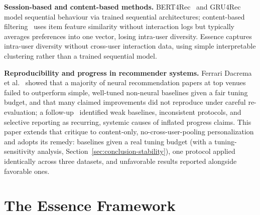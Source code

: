 \documentclass{article}
\begin{document}
\textbf{Session-based and content-based methods.} BERT4Rec~\cite{sun2019} and GRU4Rec~\cite{hidasi2016} model sequential behaviour via trained sequential architectures; content-based filtering~\cite{pazzani2007} uses item feature similarity without interaction logs but typically averages preferences into one vector, losing intra-user diversity. Essence captures intra-user diversity without cross-user interaction data, using simple interpretable clustering rather than a trained sequential model.

\textbf{Reproducibility and progress in recommender systems.} Ferrari Dacrema et al.~\cite{dacrema2019} showed that a majority of neural recommendation papers at top venues failed to outperform simple, well-tuned non-neural baselines given a fair tuning budget, and that many claimed improvements did not reproduce under careful re-evaluation; a follow-up~\cite{dacrema2021} identified weak baselines, inconsistent protocols, and selective reporting as recurring, systemic causes of inflated progress claims. This paper extends that critique to content-only, no-cross-user-pooling personalization and adopts its remedy: baselines given a real tuning budget (with a tuning-sensitivity analysis, Section~\ref{sec:conclusion-stability}), one protocol applied identically across three datasets, and unfavorable results reported alongside favorable ones.

\section{The Essence Framework}
\label{sec:framework}
\end{document}
